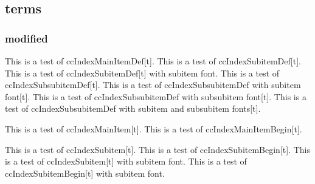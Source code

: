 \documentclass{article}
\begin{document}
{{{{%
\subsection{terms}
\subsubsection{modified}
This is a test of ccIndexMainItemDef[t].
This is a test of ccIndexSubitemDef[t].
This is a test of ccIndexSubitemDef[t] with subitem font.
This is a test of ccIndexSubsubitemDef[t].
This is a test of ccIndexSubsubitemDef with subitem font[t].
This is a test of ccIndexSubsubitemDef with subsubitem font[t].
This is a test of ccIndexSubsubitemDef with subitem and subsubitem fonts[t].

\pagebreak

This is a test of ccIndexMainItem[t].
This is a test of ccIndexMainItemBegin[t].

This is a test of ccIndexSubitem[t].
This is a test of ccIndexSubitemBegin[t].
This is a test of ccIndexSubitem[t] with subitem font.
This is a test of ccIndexSubitemBegin[t] with subitem font.

}}}}
\end{document}
